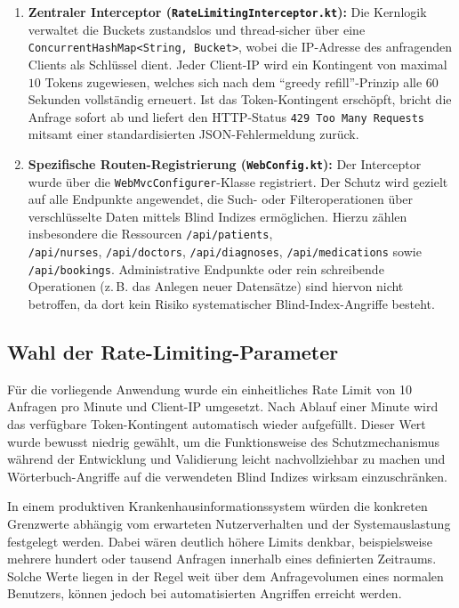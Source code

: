 \begin{enumerate}

\item \textbf{Zentraler Interceptor (\texttt{RateLimitingInterceptor.kt}):} Die Kernlogik verwaltet die Buckets zustandslos und thread-sicher über eine \texttt{ConcurrentHashMap<String, Bucket>}, wobei die IP-Adresse des anfragenden Clients als Schlüssel dient. Jeder Client-IP wird ein Kontingent von maximal $10$ Tokens zugewiesen, welches sich nach dem "`greedy refill"'-Prinzip alle 60 Sekunden vollständig erneuert. Ist das Token-Kontingent erschöpft, bricht die Anfrage sofort ab und liefert den HTTP-Status \texttt{429 Too Many Requests} mitsamt einer standardisierten JSON-Fehlermeldung zurück.

\item \textbf{Spezifische Routen-Registrierung (\texttt{WebConfig.kt}):} Der Interceptor wurde über die \texttt{WebMvcConfigurer}-Klasse registriert. Der Schutz wird gezielt auf alle Endpunkte angewendet, die Such- oder Filteroperationen über verschlüsselte Daten mittels Blind Indizes ermöglichen. Hierzu zählen insbesondere die Ressourcen \texttt{/api/patients},\\ \texttt{/api/nurses}, \texttt{/api/doctors}, \texttt{/api/diagnoses}, \texttt{/api/medications} sowie \texttt{/api/bookings}. Administrative Endpunkte oder rein schreibende Operationen (z.\,B. das Anlegen neuer Datensätze) sind hiervon nicht betroffen, da dort kein Risiko systematischer Blind-Index-Angriffe besteht.

\end{enumerate}


\subsection{Wahl der Rate-Limiting-Parameter}

Für die vorliegende Anwendung wurde ein einheitliches Rate Limit von
10 Anfragen pro Minute und Client-IP umgesetzt. Nach Ablauf einer Minute
wird das verfügbare Token-Kontingent automatisch wieder aufgefüllt.
Dieser Wert wurde bewusst niedrig gewählt, um die Funktionsweise des
Schutzmechanismus während der Entwicklung und Validierung leicht
nachvollziehbar zu machen und Wörterbuch-Angriffe auf die verwendeten
Blind Indizes wirksam einzuschränken.

In einem produktiven Krankenhausinformationssystem würden die konkreten
Grenzwerte abhängig vom erwarteten Nutzerverhalten und der
Systemauslastung festgelegt werden. Dabei wären deutlich höhere Limits
denkbar, beispielsweise mehrere hundert oder tausend Anfragen innerhalb
eines definierten Zeitraums. Solche Werte liegen in der Regel weit über
dem Anfragevolumen eines normalen Benutzers, können jedoch bei
automatisierten Angriffen erreicht werden.

